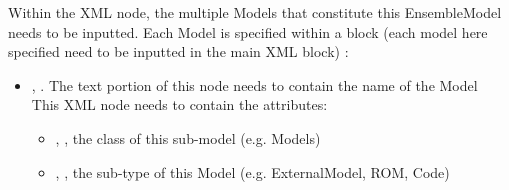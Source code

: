 Within the  XML node, the multiple Models that constitute
this EnsembleModel needs to be inputted. Each Model is specified within a  block (\nb each model
here specified need to be inputted in the main XML block) :
\begin{itemize}
  \item {}, .
  The text portion of this node needs to contain the name of the Model
  \\This XML node needs to contain the attributes:

\vspace{-5mm}
\begin{itemize}
  \itemsep0em
  \item {}, , the class of this sub-model (e.g. Models)
  \item {}, , the sub-type of this Model (e.g. ExternalModel, ROM, Code)
\end{itemize}
\vspace{-5mm}


\end{itemize}
